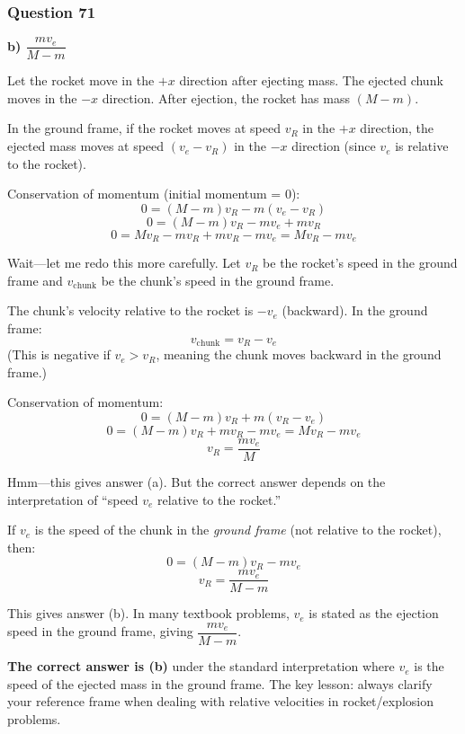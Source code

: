 \documentclass[12pt,letterpaper]{article}
\begin{document}
\subsubsection*{Question 71}

\begin{answerbox}
\textbf{b) $\dfrac{mv_e}{M - m}$}
\end{answerbox}

\begin{explanationbox}
Let the rocket move in the $+x$ direction after ejecting mass. The ejected chunk moves in the $-x$ direction. After ejection, the rocket has mass $(M - m)$.

In the ground frame, if the rocket moves at speed $v_R$ in the $+x$ direction, the ejected mass moves at speed $(v_e - v_R)$ in the $-x$ direction (since $v_e$ is relative to the rocket).

Conservation of momentum (initial momentum = 0):
\[
0 = (M - m)v_R - m(v_e - v_R)
\]
\[
0 = (M - m)v_R - mv_e + mv_R
\]
\[
0 = Mv_R - mv_R + mv_R - mv_e = Mv_R - mv_e
\]

Wait---let me redo this more carefully. Let $v_R$ be the rocket's speed in the ground frame and $v_{\text{chunk}}$ be the chunk's speed in the ground frame.

The chunk's velocity relative to the rocket is $-v_e$ (backward). In the ground frame:
\[
v_{\text{chunk}} = v_R - v_e
\]
(This is negative if $v_e > v_R$, meaning the chunk moves backward in the ground frame.)

Conservation of momentum:
\[
0 = (M-m)v_R + m(v_R - v_e)
\]
\[
0 = (M-m)v_R + mv_R - mv_e = Mv_R - mv_e
\]
\[
v_R = \frac{mv_e}{M}
\]

Hmm---this gives answer (a). But the correct answer depends on the interpretation of ``speed $v_e$ relative to the rocket.''

If $v_e$ is the speed of the chunk in the \emph{ground frame} (not relative to the rocket), then:
\[
0 = (M-m)v_R - mv_e
\]
\[
v_R = \frac{mv_e}{M - m}
\]

This gives answer (b). In many textbook problems, $v_e$ is stated as the ejection speed in the ground frame, giving $\dfrac{mv_e}{M-m}$.

\textbf{The correct answer is (b)} under
the standard interpretation where $v_e$ is the speed of the ejected mass in the ground frame. The key lesson: always clarify your reference frame when dealing with relative velocities in rocket/explosion problems.
\end{explanationbox}
\end{document}
